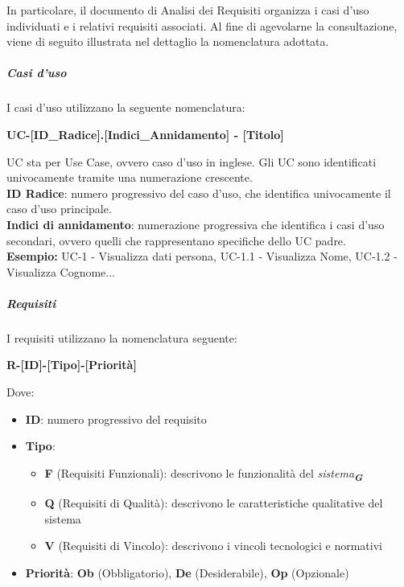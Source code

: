 \documentclass[a4paper,12pt]{article}
\newcommand{\glossario}[1]{\textit{#1}\textsubscript{\textbf{\textit{\textcolor{lightblack}{G}}}}}
\begin{document}
In particolare, il documento di Analisi dei Requisiti organizza i casi d'uso
individuati e i relativi requisiti associati. Al fine di agevolarne la
consultazione, viene di seguito illustrata nel dettaglio la nomenclatura
adottata.

\subparagraph{Casi d'uso}
I casi d'uso utilizzano la seguente nomenclatura:

\centerline{\textbf{UC-[ID\_Radice].[Indici\_Annidamento] - [Titolo]}}

UC sta per Use Case, ovvero caso d'uso in inglese. Gli UC sono identificati
univocamente tramite una numerazione crescente. \\ \textbf{ID Radice}: numero
progressivo del caso d'uso, che identifica univocamente il caso d'uso
principale. \\ \textbf{Indici di annidamento}: numerazione progressiva che
identifica i casi d'uso secondari, ovvero quelli che rappresentano specifiche
dello UC padre. \\ \textbf{Esempio:} UC-1 - Visualizza dati persona, UC-1.1 -
Visualizza Nome, UC-1.2 - Visualizza Cognome...
\subparagraph{Requisiti}
I requisiti utilizzano la nomenclatura seguente:

\centerline{\textbf{R-[ID]-[Tipo]-[Priorità]}}

Dove:
\begin{itemize}
    \item \textbf{ID}: numero progressivo del requisito
    \item \textbf{Tipo}:
          \begin{itemize}
              \item  \textbf{F} (Requisiti Funzionali): descrivono le funzionalità del \glossario{sistema}
              \item \textbf{Q} (Requisiti di Qualità): descrivono le caratteristiche qualitative del sistema
              \item \textbf{V} (Requisiti di Vincolo): descrivono i vincoli tecnologici e normativi
          \end{itemize}
    \item \textbf{Priorità}: \textbf{Ob} (Obbligatorio), \textbf{De} (Desiderabile), \textbf{Op} (Opzionale)
\end{itemize}
\end{document}
